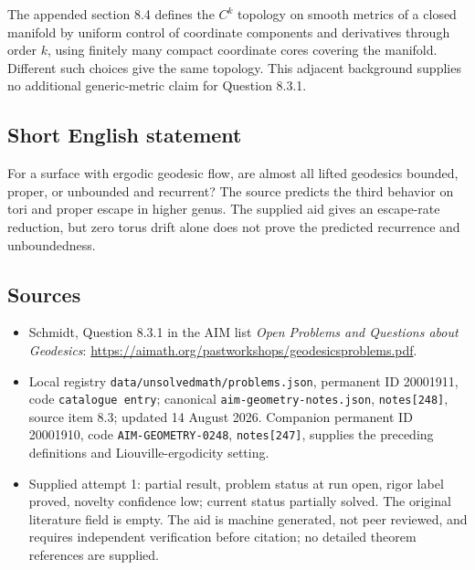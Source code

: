 \documentclass[11pt]{article}
\begin{document}
The appended section 8.4 defines the \(C^k\) topology on smooth metrics of a closed manifold by uniform control of coordinate components and derivatives through order \(k\), using finitely many compact coordinate cores covering the manifold. Different such choices give the same topology. This adjacent background supplies no additional generic-metric claim for Question 8.3.1.
\subsection{Short English statement}
For a surface with ergodic geodesic flow, are almost all lifted geodesics bounded, proper, or unbounded and recurrent? The source predicts the third behavior on tori and proper escape in higher genus. The supplied aid gives an escape-rate reduction, but zero torus drift alone does not prove the predicted recurrence and unboundedness.
\subsection{Sources}
\begin{itemize}
\item Schmidt, Question 8.3.1 in the AIM list \emph{Open Problems and Questions about Geodesics}: \url{https://aimath.org/pastworkshops/geodesicsproblems.pdf}.
\item Local registry \texttt{data/unsolvedmath/problems.json}, permanent ID 20001911, code \texttt{catalogue entry}; canonical \texttt{aim-geometry-notes.json}, \texttt{notes[248]}, source item 8.3; updated 14 August 2026. Companion permanent ID 20001910, code \texttt{AIM-GEOMETRY-0248}, \texttt{notes[247]}, supplies the preceding definitions and Liouville-ergodicity setting.
\item Supplied attempt 1: partial result, problem status at run open, rigor label proved, novelty confidence low; current status partially solved. The original literature field is empty. The aid is machine generated, not peer reviewed, and requires independent verification before citation; no detailed theorem references are supplied.
\end{itemize}
\end{document}
